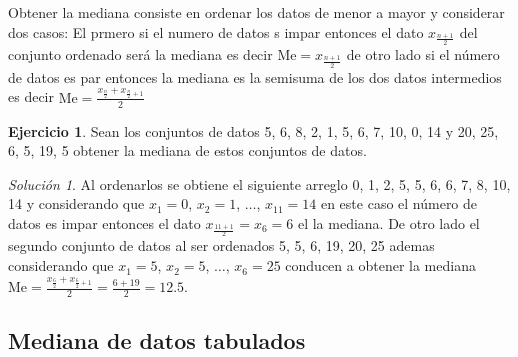 \documentclass[
  10pt,
]{krantz}
\theoremstyle{definition}
\theoremstyle{definition}
\theoremstyle{definition}
\newtheorem{exercise}{Ejercicio}[chapter]
\theoremstyle{definition}
\theoremstyle{remark}
\newtheorem*{solution}{Solución}
\begin{document}
Obtener la mediana consiste en ordenar los datos de menor a mayor y considerar dos casos: El prmero si el numero de datos s impar entonces el dato \(x_{\frac{n+1}{2}}\) del conjunto ordenado será la mediana es decir \(\text{Me}=x_{\frac{n+1}{2}}\) de otro lado si el número de datos es par entonces la mediana es la semisuma de los dos datos intermedios es decir \(\text{Me}=\frac{x_{\frac{n}{2}}+x_{\frac{n}{2}+1}}{2}\)

\begin{exercise}
\protect\hypertarget{exr:unnamed-chunk-6}{}{\label{exr:unnamed-chunk-6} }Sean los conjuntos de datos 5, 6, 8, 2, 1, 5, 6, 7, 10, 0, 14 y 20, 25, 6, 5, 19, 5 obtener la mediana de estos conjuntos de datos.
\end{exercise}

\begin{solution}
{}Al ordenarlos se obtiene el siguiente arreglo 0, 1, 2, 5, 5, 6, 6, 7, 8, 10, 14 y considerando que \(x_1=0\), \(x_2=1\), \(\ldots\), \(x_{11}=14\) en este caso el número de datos es impar entonces el dato \(x_{\frac{11+1}{2}}=x_{6}=6\) el la mediana. De otro lado el segundo conjunto de datos al ser ordenados 5, 5, 6, 19, 20, 25 ademas considerando que \(x_1=5\), \(x_2=5\), \(\ldots\), \(x_6=25\) conducen a obtener la mediana \(\text{Me}=\frac{x_{\frac{6}{2}}+x_{\frac{6}{2}+1}}{2}=\frac{6+19}{2}=12.5\).
\end{solution}

\hypertarget{mediana-de-datos-tabulados}{%
\subsection{Mediana de datos tabulados}\label{mediana-de-datos-tabulados}}
\end{document}
